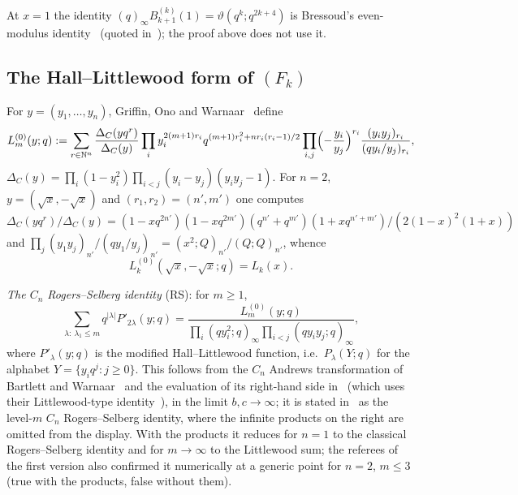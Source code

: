 \documentclass[11pt]{amsart}
\theoremstyle{definition}
\numberwithin{equation}{section}
\newcommand{\N}{\mathbb{N}}
\begin{document}
At $x=1$ the identity $(q)_\infty B^{(k)}_{k+1}(1)=\vartheta(q^k;q^{2k+4})$ is Bressoud's even-modulus
identity~\cite{Bressoud79,Bressoud80} (quoted in~\cite[(3.6)]{KRTW}); the proof above does not use it.

\subsection{The Hall--Littlewood form of \texorpdfstring{$(F_k)$}{(F\_k)}}\label{ssec:HL}
For $y=(y_1,\dots,y_n)$, Griffin, Ono and Warnaar~\cite[§3.1]{GOW} define
\[
L^{(0)}_m(y;q):=\sum_{r\in\N^n}\frac{\Delta_C(yq^r)}{\Delta_C(y)}\prod_iy_i^{2(m+1)r_i}q^{(m+1)r_i^2+n r_i(r_i-1)/2}
\prod_{i,j}\Bigl(-\frac{y_i}{y_j}\Bigr)^{r_i}\frac{(y_iy_j)_{r_i}}{(qy_i/y_j)_{r_i}},
\]
$\Delta_C(y)=\prod_i(1-y_i^2)\prod_{i<j}(y_i-y_j)(y_iy_j-1)$. For $n=2$, $y=(\sqrt x,-\sqrt x)$ and
$(r_1,r_2)=(n',m')$ one computes
$\Delta_C(yq^r)/\Delta_C(y)=(1-xq^{2n'})(1-xq^{2m'})(q^{n'}+q^{m'})(1+xq^{n'+m'})/(2(1-x)^2(1+x))$ and
$\prod_j(y_1y_j)_{n'}/(qy_1/y_j)_{n'}=(x^2;Q)_{n'}/(Q;Q)_{n'}$, whence
\begin{equation}\label{eq:Lspec}
L^{(0)}_k(\sqrt x,-\sqrt x;q)=L_k(x).
\end{equation}

\emph{The $C_n$ Rogers--Selberg identity} (RS): for $m\ge1$,
\[
\sum_{\lambda:\ \lambda_1\le m}q^{|\lambda|}P'_{2\lambda}(y;q)=\frac{L^{(0)}_m(y;q)}{\prod_i(qy_i^2;q)_\infty\prod_{i<j}(qy_iy_j;q)_\infty},
\]
where $P'_\lambda(y;q)$ is the modified Hall--Littlewood function, i.e.\ $P_\lambda(Y;q)$ for the alphabet
$Y=\{y_iq^j:j\ge0\}$. This follows from the $C_n$ Andrews transformation of Bartlett and
Warnaar~\cite[Theorem~4.2]{BW} and the evaluation of its right-hand side in~\cite[§5.1]{BW} (which uses
their Littlewood-type identity~\cite[Corollary~3.4]{BW}), in the limit $b,c\to\infty$; it is stated
in~\cite[§3.1]{GOW} as the level-$m$ $C_n$ Rogers--Selberg identity, where the infinite products on the
right are omitted from the display. With the products it reduces for $n=1$ to the classical
Rogers--Selberg identity and for $m\to\infty$ to the Littlewood sum; the referees of the first version also
confirmed it numerically at a generic point for $n=2$, $m\le3$ (true with the products, false without them).
\end{document}
